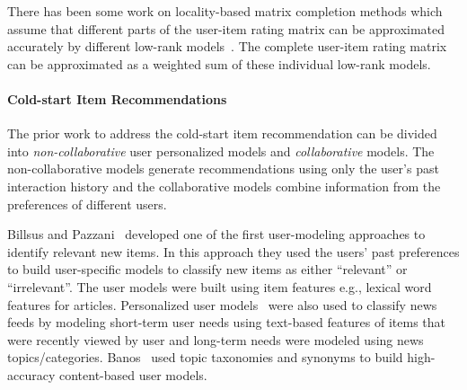 There has been some work on locality-based matrix completion  methods which
assume that different parts of the user-item rating matrix can be approximated
accurately by different low-rank models~\cite{lee2013local,
lee2014local,chen2015wemarec}. The complete user-item rating matrix
can be approximated as a weighted sum of these individual low-rank models. 

\iffalse
In
our work, we estimate a single low-rank model, rather than multiple different
low-rank models, that adaptively select a subset of ranks for a rating by a
user on an item by considering the number of ratings provided by the user and
the number of ratings received by the item.
\fi



\paragraph{Cold-start Item Recommendations}
The prior work to address the cold-start item recommendation can be divided 
into \emph{non-collaborative} user personalized models 
and \emph{collaborative} models. The non-collaborative models generate recommendations 
using only the user's past
interaction history and the collaborative models combine information from
the preferences of different users. 



Billsus and Pazzani~\cite{billsus99} developed one of the first user-modeling
approaches to identify relevant new items. In this approach they used the users'
past preferences to build user-specific models to classify new items
as either ``relevant'' or ``irrelevant''. The user models were built using
item features e.g., lexical word features for articles. Personalized 
user models~\cite{rodriguez01} were also used to classify news feeds by modeling short-term user needs 
using text-based features of items that were recently viewed by user and long-term needs were
modeled using news topics/categories. Banos~\cite{banos06}
used topic taxonomies and synonyms to build high-accuracy 
content-based user models. 

